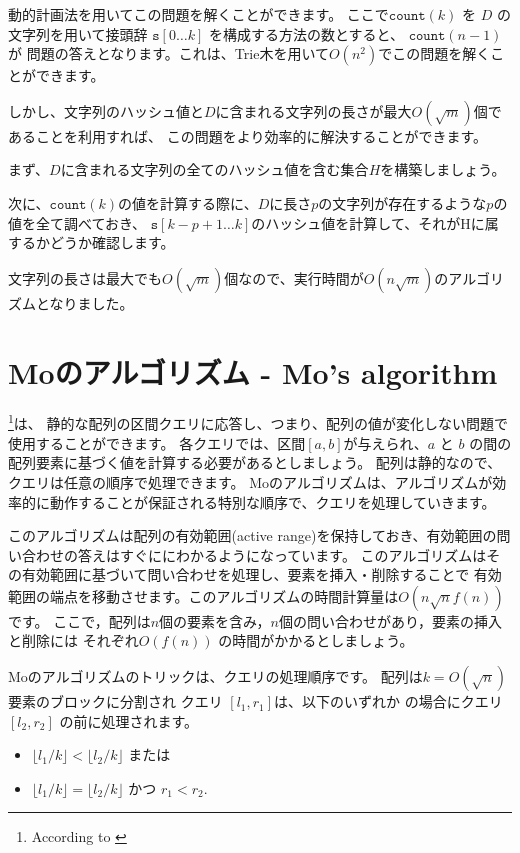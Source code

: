 動的計画法を用いてこの問題を解くことができます。
ここで$\texttt{count}(k)$ を $D$ の文字列を用いて接頭辞 $\texttt{s}[0 \ldots k]$ を構成する方法の数とすると、
$\texttt{count}(n-1)$が
問題の答えとなります。これは、Trie木を用いて$O(n^2)$でこの問題を解くことができます。

しかし、文字列のハッシュ値と$D$に含まれる文字列の長さが最大$O(\sqrt m)$個であることを利用すれば、
この問題をより効率的に解決することができます。

まず、$D$に含まれる文字列の全てのハッシュ値を含む集合$H$を構築しましょう。

次に、$\texttt{count}(k)$の値を計算する際に、$D$に長さ$p$の文字列が存在するような$p$の値を全て調べておき、
$\texttt{s}[k-p+1 \ldots k]$のハッシュ値を計算して、それがHに属するかどうか確認します。

文字列の長さは最大でも$O(\sqrt m)$個なので、実行時間が$O(n \sqrt m)$のアルゴリズムとなりました。

\section{Moのアルゴリズム - Mo's algorithm}


\footnote{According to \cite{cod15}}は、
静的な配列の区間クエリに応答し、つまり、配列の値が変化しない問題で使用することができます。
各クエリでは、区間$[a,b]$が与えられ、$a$ と $b$ の間の配列要素に基づく値を計算する必要があるとしましょう。
配列は静的なので、クエリは任意の順序で処理できます。
Moのアルゴリズムは、アルゴリズムが効率的に動作することが保証される特別な順序で、クエリを処理していきます。

このアルゴリズムは配列の有効範囲(active range)を保持しておき、有効範囲の問い合わせの答えはすぐににわかるようになっています。
このアルゴリズムはその有効範囲に基づいて問い合わせを処理し、要素を挿入・削除することで
有効範囲の端点を移動させます。このアルゴリズムの時間計算量は$O(n \sqrt n f(n))$ です。
ここで，配列は$n$個の要素を含み，$n$個の問い合わせがあり，要素の挿入と削除には それぞれ$O(f(n))$ の時間がかかるとしましょう。

Moのアルゴリズムのトリックは、クエリの処理順序です。
配列は$k=O(\sqrt n)$要素のブロックに分割され
クエリ $[l_1,r_1]$は、以下のいずれか の場合にクエリ$[l_2,r_2]$ の前に処理されます。

\begin{itemize}
\item $\lfloor l_1/k \rfloor < \lfloor l_2/k \rfloor$ または
\item $\lfloor l_1/k \rfloor = \lfloor l_2/k \rfloor$ かつ $r_1 < r_2$.
\end{itemize}

